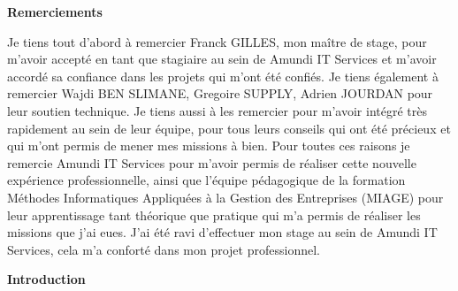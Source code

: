 \documentclass[12pt,a4paper]{report}
\begin{document}
\newpage
\begin{center} \textbf{\Large Remerciements} \vspace{2cm} \end{center} 

Je tiens tout d'abord à remercier Franck GILLES, mon maître de stage, pour m'avoir accepté en tant que stagiaire au sein de Amundi IT Services et m'avoir accordé sa confiance dans les projets qui m'ont été confiés.
Je tiens également à remercier Wajdi BEN SLIMANE, Gregoire SUPPLY, Adrien JOURDAN pour leur soutien technique.
Je tiens aussi à les remercier pour m'avoir intégré très rapidement au sein de leur équipe, pour tous leurs conseils qui ont été précieux et qui m'ont permis de mener mes missions à bien.\vspace{0.6cm}
\newline
Pour toutes ces raisons je remercie Amundi IT Services pour m'avoir permis de réaliser cette nouvelle expérience professionnelle, ainsi que l'équipe pédagogique  de la formation Méthodes Informatiques Appliquées à la Gestion des Entreprises (MIAGE) pour leur apprentissage tant théorique que pratique qui m'a permis de réaliser les missions que j'ai eues. \vspace{0.6cm}
\newline
J'ai été ravi d'effectuer mon stage au sein de Amundi IT Services, cela m'a conforté dans mon projet professionnel.

\newpage
\begin{center} \textbf{\Large Introduction} \vspace{2cm} \end{center} 
\end{document}
